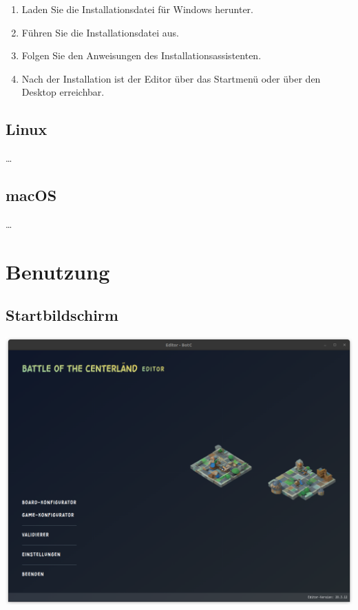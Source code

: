 \documentclass[12pt]{gruppe-11-article-a5}
\begin{document}
	\begin{enumerate}
		\item Laden Sie die Installationsdatei für Windows herunter.
		\item Führen Sie die Installationsdatei aus.
		\item Folgen Sie den Anweisungen des Installationsassistenten.
		\item Nach der Installation ist der Editor über das Startmenü oder über den Desktop erreichbar.
	\end{enumerate}

	\subsection{Linux}\label{subsec:linux}

	\dots

	\subsection{macOS}\label{subsec:macos}

	\dots


	\section{Benutzung}\label{sec:benutzung}

	\subsection{Startbildschirm}\label{subsec:startbildschirm}

	\includegraphics[width=\textwidth]{./Handbuch/assets/Startbildschirm}
\end{document}
